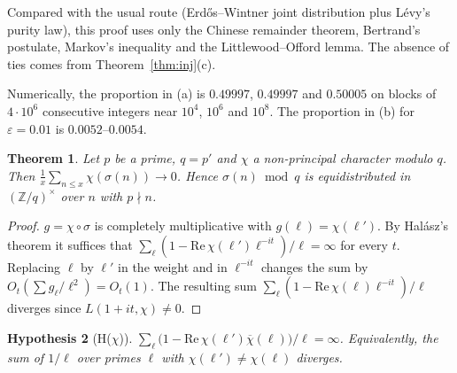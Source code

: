 \documentclass[11pt]{amsart}
\newtheorem{theorem}{Theorem}[section]
\newtheorem{hypothesis}[theorem]{Hypothesis}
\theoremstyle{remark}
\newcommand{\s}{\sigma}
\newcommand{\nx}[1]{#1'}
\begin{document}
Compared with the usual route (Erd\H{o}s--Wintner joint distribution plus L\'evy's purity law), this proof uses only the Chinese remainder theorem, Bertrand's postulate, Markov's inequality and the Littlewood--Offord lemma. The absence of ties comes from Theorem~\ref{thm:inj}(c).

Numerically, the proportion in (a) is $0.49997$, $0.49997$ and $0.50005$ on blocks of $4\cdot10^6$ consecutive integers near $10^4$, $10^6$ and $10^8$. The proportion in (b) for $\varepsilon=0.01$ is $0.0052$--$0.0054$.

\begin{theorem}\label{thm:onept}
Let $p$ be a prime, $q=\nx p$ and $\chi$ a non-principal character modulo $q$. Then $\frac1x\sum_{n\le x}\chi(\s(n))\to0$. Hence $\s(n)\bmod q$ is equidistributed in $(\mathbb Z/q)^\times$ over $n$ with $p\nmid n$.
\end{theorem}
\begin{proof}
$g=\chi\circ\s$ is completely multiplicative with $g(\ell)=\chi(\nx\ell)$. By Hal\'asz's theorem it suffices that $\sum_\ell(1-\mathrm{Re}\,\chi(\nx\ell)\ell^{-it})/\ell=\infty$ for every $t$. Replacing $\ell$ by $\nx\ell$ in the weight and in $\ell^{-it}$ changes the sum by $O_t(\sum g_\ell/\ell^2)=O_t(1)$. The resulting sum $\sum_{\ell}(1-\mathrm{Re}\,\chi(\ell)\ell^{-it})/\ell$ diverges since $L(1+it,\chi)\neq0$.
\end{proof}

\begin{hypothesis}[H($\chi$)]
$\sum_{\ell}\bigl(1-\mathrm{Re}\,\chi(\nx\ell)\overline{\chi}(\ell)\bigr)/\ell=\infty$. Equivalently, the sum of $1/\ell$ over primes $\ell$ with $\chi(\nx\ell)\ne\chi(\ell)$ diverges.
\end{hypothesis}
\end{document}
